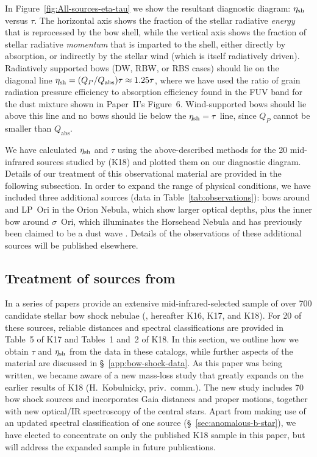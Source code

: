 In Figure~\ref{fig:All-sources-eta-tau} we show the resultant
diagnostic diagram: \(\eta_{\text{sh}}\) versus \(\tau\).  The horizontal axis
shows the fraction of the stellar radiative \emph{energy} that is
reprocessed by the bow shell, while the vertical axis shows the
fraction of stellar radiative \emph{momentum} that is imparted to the
shell, either directly by absorption, or indirectly by the stellar
wind (which is itself radiatively driven).  Radiatively supported bows
(DW, RBW, or RBS cases) should lie on the diagonal line
\(\eta_{\text{sh}} = ( Q_P / Q_{\text{abs}}) \tau \approx 1.25 \tau\), where we have used
the ratio of grain radiation pressure efficiency to absorption
efficiency found in the FUV band for the dust mixture shown in
Paper~II's Figure~6.  Wind-supported bows should lie above this line
and no bows should lie below the \(\eta_{\text{sh}} = \tau\) line, since
\(Q_P\) cannot be smaller than \(Q_{\text{abs}}\).

We have calculated \(\eta_{\text{sh}}\) and \(\tau\) using the above-described
methods for the 20 mid-infrared sources studied by
\citet{Kobulnicky:2018a} (K18) and plotted them on our diagnostic
diagram.  Details of our treatment of this observational material are
provided in the following subsection.  In order to expand the range of
physical conditions, we have included three additional sources (data
in Table~\ref{tab:observations}): bows around \thD{}
\citep{Smith:2005a} and LP~Ori \citep{ODell:2001c} in the Orion
Nebula, which show larger optical depths, plus the inner bow around
\(\sigma\)~Ori, which illuminates the Horsehead Nebula and has previously
been claimed to be a dust wave \citep{Ochsendorf:2014b,
  Ochsendorf:2015a}.  Details of the observations of these additional
sources will be published elsewhere.


\subsection{Treatment of sources from \citeauthor{Kobulnicky:2018a}}
\label{sec:kobulnicky}

In a series of papers \citeauthor{Kobulnicky:2018a} provide an
extensive mid-infrared-selected sample of over 700 candidate stellar
bow shock nebulae (\citealp{Kobulnicky:2016a, Kobulnicky:2017a,
  Kobulnicky:2018a}, hereafter K16, K17, and K18).  For 20 of these
sources, reliable distances and spectral classifications are provided
in Table~5 of K17 and Tables~1 and~2 of K18. In this section, we
outline how we obtain \(\tau\) and \(\eta_{\text{sh}}\) from the data in
these catalogs, while further aspects of the
\citeauthor{Kobulnicky:2018a} material are discussed in
\S~\ref{app:bow-shock-data}.  As this paper was being written, we
became aware of a new mass-loss study that greatly expands on the
earlier results of K18 (H.~Kobulnicky, priv.~comm.).  The new study
includes 70 bow shock sources and incorporates Gaia distances and
proper motions, together with new optical/IR spectroscopy of the
central stars.  Apart from making use of an updated spectral
classification of one source (\S~\ref{sec:anomalous-b-star}), we have
elected to concentrate on only the published K18 sample in this paper,
but will address the expanded sample in future publications.

